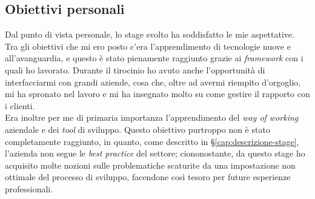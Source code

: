 \subsection*{Obiettivi personali}
Dal punto di vista personale, lo stage svolto ha soddisfatto le mie aspettative. Tra gli obiettivi che mi ero posto c'era l'apprendimento di tecnologie nuove e all'avanguardia, e questo è stato pienamente raggiunto grazie ai \textit{\gls{framework}} con i quali ho lavorato. Durante il tirocinio ho avuto anche l'opportunità di interfacciarmi con grandi aziende, cosa che, oltre ad avermi riempito d'orgoglio, mi ha spronato nel lavoro e mi ha insegnato molto su come gestire il rapporto con i clienti.\\
Era inoltre per me di primaria importanza l'apprendimento del \textit{\gls{way of working}} aziendale e dei \textit{tool} di sviluppo. Questo obiettivo purtroppo non è stato completamente raggiunto, in quanto, come descritto in §\ref{cap:descrizione-stage}, l'azienda non segue le \textit{best practice} del settore; ciononostante, da questo stage ho acquisito molte nozioni sulle problematiche scaturite da una impostazione  non ottimale del processo di sviluppo, facendone così tesoro per future esperienze professionali.
